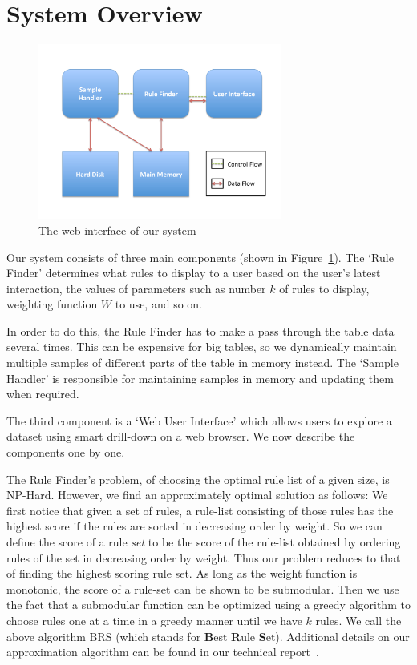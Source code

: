 
\section{System Overview}\label{sec:system}

\begin{figure}
\vspace{-5pt}
\centering
\includegraphics[width=80mm]{graphs/SmartDrillDownSystem.pdf}
\vspace{-20pt}
\caption{The web interface of our system \label{fig:system}}
\vspace{-15pt}
\end{figure}

Our system consists of three main components (shown in Figure~\ref{fig:system}). The `Rule Finder' determines what rules to display to a user based on the user's latest interaction, the values of parameters such as number $k$ of rules to display, weighting function $W$ to use, and so on. 

In order to do this, the Rule Finder has to make a pass through the table data several times. This can be expensive for big tables, so we dynamically maintain multiple samples of different parts of the table in memory instead. The `Sample Handler' is responsible for maintaining samples in memory and updating them when required. 

The third component is a `Web User Interface' which allows users to explore a dataset using smart drill-down on a web browser. We now describe the components one by one.

The Rule Finder's problem, of choosing the optimal rule list of a given size, is NP-Hard. However, we find an approximately optimal solution as follows: We first notice that given a set of rules, a rule-list consisting of those rules has the highest score if the rules are sorted in decreasing order by weight. So we can define the score of a rule {\em set} to be the score of the rule-list obtained by ordering rules of the set in decreasing order by weight. Thus our problem reduces to that of finding the highest scoring rule set. As long as the weight function is monotonic, the score of a rule-set can be shown to be submodular. Then we use the fact that a submodular function can be optimized using a greedy algorithm to choose rules one at a time in a greedy manner until we have $k$ rules. We call the above algorithm BRS (which stands for {\bf B}est {\bf R}ule {\bf S}et). Additional details on our approximation algorithm can be found in our technical report~\cite{tr}. 

